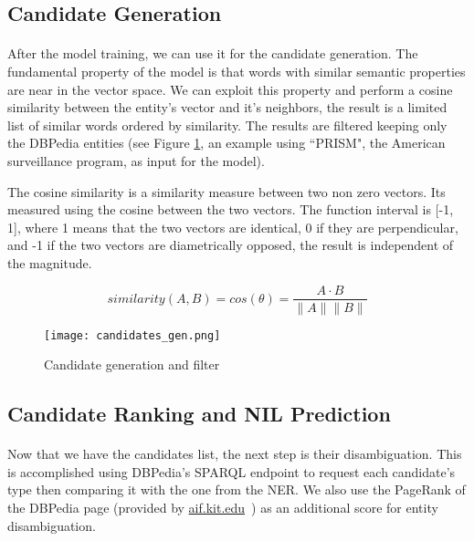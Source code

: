 \subsection{Candidate Generation}
\paragraph{}
After the model training, we can use it for the candidate generation. The fundamental property of the model is that words with similar semantic properties are near in the vector space. We can exploit this property and perform a cosine similarity between the entity's vector and it's neighbors, the result is a limited list of similar words ordered by similarity. The results are filtered keeping only the DBPedia entities (see Figure \ref{fig:candidates_gen}, an example using ``PRISM", the American surveillance program, as input for the model).


The cosine similarity is a similarity measure between two non zero vectors. Its measured using the cosine between the two vectors. The function interval is [-1, 1], where 1 means that the two vectors are identical, 0 if they are perpendicular, and -1 if the two vectors are diametrically opposed, the result is independent of the magnitude. 

\begin{equation}
similarity(A, B) = cos(\theta) = \frac{A \cdot B}{\lVert A \rVert \lVert B \rVert}
\end{equation}


\vspace{-10pt}
\begin{figure}[h]
\texttt{[image: candidates\_gen.png]}
\caption{Candidate generation and filter}
\label{fig:candidates_gen}
\end{figure}
\vspace{-10pt}

\subsection{Candidate Ranking and NIL Prediction }
\paragraph{}
Now that we have the candidates list, the next step is their disambiguation. This is accomplished using DBPedia's SPARQL endpoint to request each candidate's type then  comparing it with the one from the NER. We also use the PageRank of the DBPedia page (provided by \href{http://people.aifb.kit.edu/ath/}{aif.kit.edu}~\cite{Thalhammer2016}) as an additional score for entity disambiguation.

